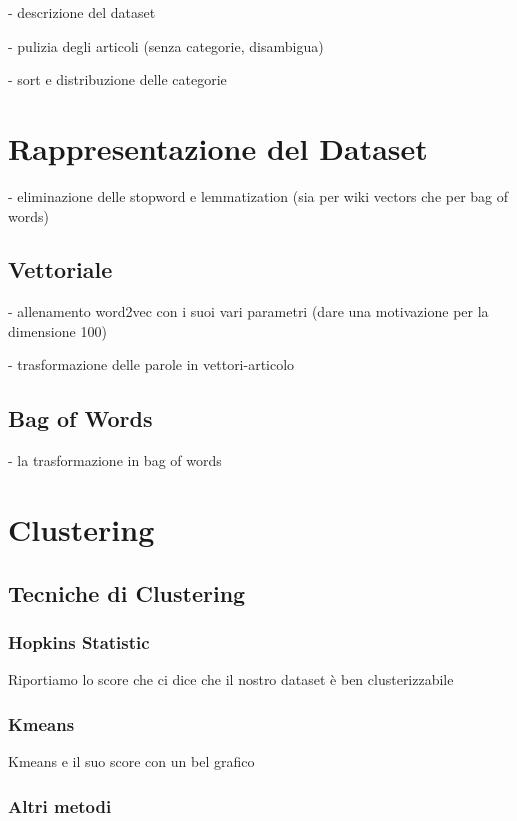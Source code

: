 \documentclass[
12pt, %
a4paper, %
oneside, %
headinclude,footinclude, %
BCOR5mm, %
]{scrartcl}
\begin{document}
	- descrizione del dataset
	
	- pulizia degli articoli (senza categorie, disambigua)
	
	- sort e distribuzione delle categorie


\section{Rappresentazione del Dataset}

	- eliminazione delle stopword e lemmatization (sia per wiki vectors che per bag of words)

	\subsection{Vettoriale}

		- allenamento word2vec con i suoi vari parametri (dare una motivazione per la dimensione 100)

		- trasformazione delle parole in vettori-articolo

	\subsection{Bag of Words}

		- la trasformazione in bag of words



\section{Clustering}

	\subsection{Tecniche di Clustering}

		\subsubsection{Hopkins Statistic}

			Riportiamo lo score che ci dice che il nostro dataset è ben clusterizzabile

		\subsubsection{Kmeans}

			Kmeans e il suo score con un bel grafico

		\subsubsection{Altri metodi}
\end{document}
